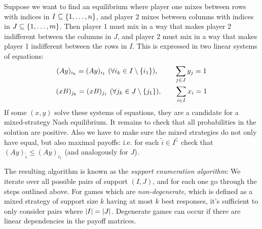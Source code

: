 \documentclass[a4paper]{scrreprt}
\begin{document}
    Suppose we want to find an equilibrium where player one mixes between rows with indices in $I \subseteq \{1, \dots, n\}$, and player 2 mixes between columns with indices in $J \subseteq \{1, \dots, m\}$. Then player 1 must mix in a way that makes player 2 indifferent between the columns in $J$, and player 2 must mix in a way that makes player 1 indifferent between the rows in $I$.
    This is expressed in two linear systems of equations:
    \begin{gather}
        (Ay)_{i_k} = (Ay)_{i_1} ~(\forall i_k \in I \setminus\{i_1\}), \qquad\;\, \sum_{j \in J} y_j = 1 \\
        (xB)_{j_k} = (xB)_{j_1} ~(\forall j_k \in J \setminus\{j_1\}), \qquad \sum_{i \in I} x_i = 1
    \end{gather}
    If some $(x, y)$ solve these systems of equations, they are a candidate for a mixed-strategy Nash equilibrium.
    It remains to check that all probabilities in the solution are positive. Also we have to make sure the mixed strategies do not only have equal, but also maximal payoffs: i.e. for each $\tilde{i}\in I^\complement$ check that $(Ay)_{\tilde{i}} \leq (Ay)_{i_1}$ (and analogously for $J$).
    
    The resulting algorithm is known as the \emph{support enumeration algorithm}: We iterate over all possible pairs of support $(I, J)$, and for each one go through the steps outlined above. For games which are \emph{non-degenerate}, which is defined as a mixed strategy of support size $k$ having at most $k$ best responses, it's sufficient to only consider pairs where $\left| I \right| = \left| J \right|$. Degenerate games can occur if there are linear dependencies in the payoff matrices.
    
\end{document}
